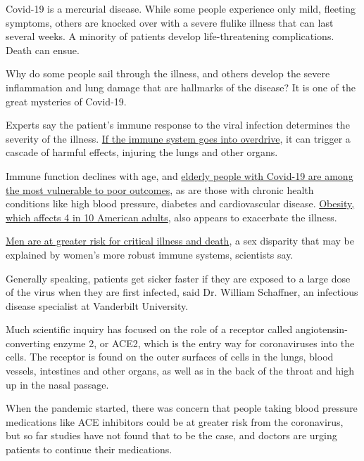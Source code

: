 Covid-19 is a mercurial disease. While some people experience only mild,
fleeting symptoms, others are knocked over with a severe flulike illness
that can last several weeks. A minority of patients develop
life-threatening complications. Death can ensue.

Why do some people sail through the illness, and others develop the
severe inflammation and lung damage that are hallmarks of the disease?
It is one of the great mysteries of Covid-19.

Experts say the patient's immune response to the viral infection
determines the severity of the illness.
\href{https://www.nytimes3xbfgragh.onion/2020/04/01/health/coronavirus-cytokine-storm-immune-system.html}{If
the immune system goes into overdrive}, it can trigger a cascade of
harmful effects, injuring the lungs and other organs.

Immune function declines with age, and
\href{https://www.nytimes3xbfgragh.onion/2020/03/14/health/coronavirus-elderly-protection.html}{elderly
people with Covid-19 are among the most vulnerable to poor outcomes}, as
are those with chronic health conditions like high blood pressure,
diabetes and cardiovascular disease.
\href{https://www.nytimes3xbfgragh.onion/2020/04/16/health/coronavirus-obesity-higher-risk.html}{Obesity,
which affects 4 in 10 American adults}, also appears to exacerbate the
illness.

\href{https://www.nytimes3xbfgragh.onion/2020/04/07/health/coronavirus-new-york-men.html}{Men
are at greater risk for critical illness and death}, a sex disparity
that may be explained by women's more robust immune systems, scientists
say.

Generally speaking, patients get sicker faster if they are exposed to a
large dose of the virus when they are first infected, said Dr. William
Schaffner, an infectious disease specialist at Vanderbilt University.

Much scientific inquiry has focused on the role of a receptor called
angiotensin-converting enzyme 2, or ACE2, which is the entry way for
coronaviruses into the cells. The receptor is found on the outer
surfaces of cells in the lungs, blood vessels, intestines and other
organs, as well as in the back of the throat and high up in the nasal
passage.

When the pandemic started, there was concern that people taking blood
pressure medications like ACE inhibitors could be at greater risk from
the coronavirus, but so far studies have not found that to be the case,
and doctors are urging patients to continue their medications.

